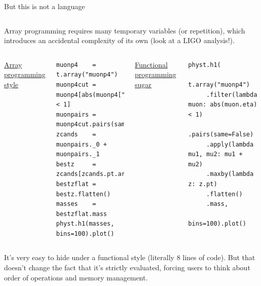 \documentclass[aspectratio=169]{beamer}
\begin{document}
\begin{frame}[fragile]{But this is not a language}
\vspace{0.5 cm}

\begin{columns}
Array programming requires many temporary variables (or repetition), which introduces an accidental complexity of its own (look at a LIGO analysis!).
\end{columns}

\vspace{0.75 cm}
\begin{columns}[t]
\underline{Array programming style}

\scriptsize
\vspace{\baselineskip}
\begin{verbatim}
muonp4    = t.array("muonp4")
muonp4cut = muonp4[abs(muonp4["eta"]) < 1]
muonpairs = muonp4cut.pairs(same=False)
zcands    = muonpairs._0 + muonpairs._1
bestz     = zcands[zcands.pt.argmax()]
bestzflat = bestz.flatten()
masses    = bestzflat.mass
physt.h1(masses, bins=100).plot()
\end{verbatim}

\underline{Functional programming sugar}

\scriptsize
\begin{verbatim}
physt.h1(
    t.array("muonp4")
     .filter(lambda muon: abs(muon.eta) < 1)
     .pairs(same=False)
     .apply(lambda mu1, mu2: mu1 + mu2)
     .maxby(lambda z: z.pt)
     .flatten()
     .mass,
    bins=100).plot()
\end{verbatim}
\end{columns}

\vspace{0.75 cm}
\begin{columns}
It's very easy to hide under a functional style (literally 8 lines of code). But that doesn't change the fact that it's strictly evaluated, forcing users to think about order of operations and memory management.
\end{columns}
\end{frame}
\end{document}
